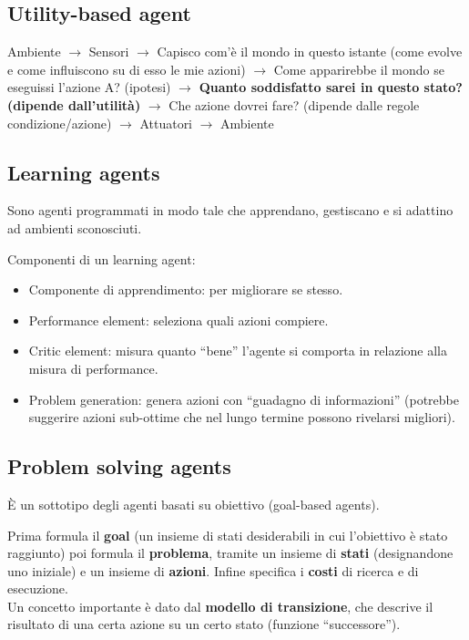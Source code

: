 \subsection{Utility-based agent}

Ambiente $\rightarrow$ Sensori $\rightarrow$ Capisco com'è il mondo in questo istante (come evolve e come influiscono su di esso le mie azioni) $\rightarrow$ Come apparirebbe il mondo se eseguissi l'azione A? (ipotesi) $\rightarrow$ \textbf{Quanto soddisfatto sarei in questo stato? (dipende dall'utilità)} $\rightarrow$ Che azione dovrei fare? (dipende dalle regole condizione/azione) $\rightarrow$ Attuatori $\rightarrow$ Ambiente

\subsection{Learning agents}

Sono agenti programmati in modo tale che apprendano, gestiscano e si adattino
ad ambienti sconosciuti.

Componenti di un learning agent:

\begin{itemize}
 \item Componente di apprendimento: per migliorare se stesso.
 \item Performance element: seleziona quali azioni compiere.
 \item Critic element: misura quanto ``bene'' l'agente si comporta in relazione
alla misura di performance.
 \item Problem generation: genera azioni con ``guadagno di informazioni''
(potrebbe suggerire azioni sub-ottime che nel lungo termine possono rivelarsi
migliori).
\end{itemize}

\subsection{Problem solving agents}

È un sottotipo degli agenti basati su obiettivo (goal-based agents).

Prima formula il \textbf{goal} (un insieme di stati desiderabili in cui
l'obiettivo è stato raggiunto) poi formula il \textbf{problema}, tramite un
insieme di \textbf{stati} (designandone uno iniziale) e un insieme di
\textbf{azioni}.
Infine specifica i \textbf{costi} di ricerca e di esecuzione. \\

Un concetto importante è dato dal \textbf{modello di transizione}, che descrive
il risultato di una certa azione su un certo stato (funzione ``successore'').

